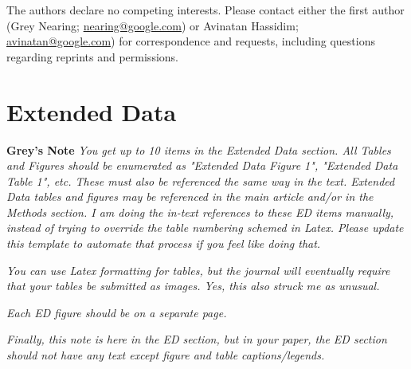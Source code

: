 \documentclass[pdflatex]{sn-jnl}
\begin{document}
The authors declare no competing interests. Please contact either the first author (Grey Nearing; \href{mailto:nearing@google.com}{nearing@google.com}) or Avinatan Hassidim; \href{mailto:avinatan@google.com}{avinatan@google.com}) for correspondence and requests, including questions regarding reprints and permissions.


\newpage
\section*{Extended Data}
\textbf{Grey's Note} \textit{You get up to 10 items in the Extended Data section. All Tables and Figures should be enumerated as "Extended Data Figure 1", "Extended Data Table 1", etc. These must also be referenced the same way in the text. Extended Data tables and figures may be referenced in the main article and/or in the Methods section. I am doing the in-text references to these ED items manually, instead of trying to override the table numbering schemed in Latex. Please update this template to automate that process if you feel like doing that.}

\textit{You can use Latex formatting for tables, but the journal will eventually require that your tables be submitted as images. Yes, this also struck me as unusual.}

\textit{Each ED figure should be on a separate page.}

\textit{Finally, this note is here in the ED section, but in your paper, the ED section should not have any text except figure and table captions/legends.}
\end{document}
